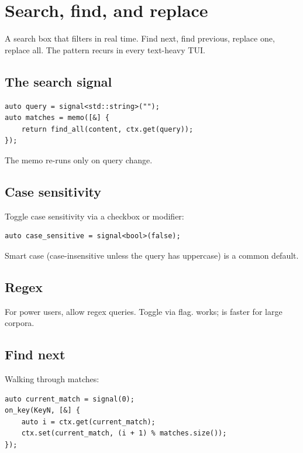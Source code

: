 \chapter{Search, find, and replace}
\label{ch:search}

\begin{aside}
A search box that filters in real time. Find next, find
previous, replace one, replace all. The pattern recurs in
every text-heavy TUI.
\end{aside}

\section{The search signal}

\begin{lstlisting}
auto query = signal<std::string>("");
auto matches = memo([&] {
    return find_all(content, ctx.get(query));
});
\end{lstlisting}

The memo re-runs only on query change.

\section{Case sensitivity}

Toggle case sensitivity via a checkbox or modifier:

\begin{lstlisting}
auto case_sensitive = signal<bool>(false);
\end{lstlisting}

Smart case (case-insensitive unless the query has
uppercase) is a common default.

\section{Regex}

For power users, allow regex queries. Toggle via flag.
 works;  is faster for large
corpora.

\section{Find next}

Walking through matches:

\begin{lstlisting}
auto current_match = signal(0);
on_key(KeyN, [&] {
    auto i = ctx.get(current_match);
    ctx.set(current_match, (i + 1) % matches.size());
});
\end{lstlisting}

